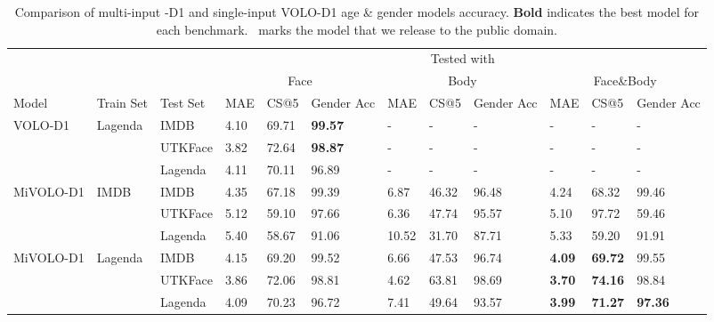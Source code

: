 \begin{table*}[t]
\centering
\begin{tabular}{|p{2.1cm}|p{1cm}|
p{1.3cm}|p{0.84cm} p{0.84cm} p{0.84cm} |p{0.84cm} p{0.84cm} p{0.84cm}|p{0.84cm} p{0.84cm} p{0.84cm}|}
\hline
\multicolumn{3}{|c|}{} & \multicolumn{9}{c|}{Tested with} \\ [1ex] 
\multicolumn{3}{|c|}{} & \multicolumn{3}{c|}{Face} & \multicolumn{3}{c|}{Body} & \multicolumn{3}{c|}{Face\&Body} \\ [1ex] 
\hline
\hline
 \multicolumn{1}{|p{2.0cm}|}{Model} & \multicolumn{1}{p{1.1cm}|}{Train Set} & \multicolumn{1}{p{1.3cm}|}{Test Set} & \multicolumn{1}{p{0.83cm}}{MAE} & \multicolumn{1}{p{0.83cm}}{CS@5} & \multicolumn{1}{p{0.86cm}|}{Gender Acc}& \multicolumn{1}{p{0.83cm}}{MAE} & \multicolumn{1}{p{0.83cm}}{CS@5} & \multicolumn{1}{p{0.86cm}|}{Gender Acc} & \multicolumn{1}{p{0.83cm}}{MAE} & \multicolumn{1}{p{0.83cm}}{CS@5} & \multicolumn{1}{p{0.86cm}|}{Gender Acc} \\ [1ex]
\hline
VOLO-D1 & Lagenda & IMDB & 4.10 & 69.71 & \textbf{99.57} & - & - & - & - & - & - \\  
 &  & UTKFace & 3.82 & 72.64 & \textbf{98.87} & - & - & - & - & - & - \\   
 &  & Lagenda & 4.11 & 70.11 & 96.89 & - & - & - & - & - & - \\   
\hline
MiVOLO-D1 & IMDB & IMDB & 4.35 & 67.18 & 99.39 & 6.87 & 46.32 & 96.48 & 4.24 & 68.32 & 99.46 \\   
 &  & UTKFace & 5.12 & 59.10 & 97.66 & 6.36 & 47.74 & 95.57 & 5.10 & 97.72 & 59.46 \\   
 &  & Lagenda & 5.40 & 58.67 & 91.06 & 10.52 & 31.70 & 87.71 & 5.33 & 59.20 & 91.91 \\ 
\hline
MiVOLO-D1 & Lagenda & IMDB & 4.15 & 69.20 & 99.52 & 6.66 & 47.53 & 96.74 & \textbf{4.09} & \textbf{69.72} & 99.55 \\   
 &  & UTKFace & 3.86 & 72.06 & 98.81 & 4.62 & 63.81 & 98.69 & \textbf{3.70} & \textbf{74.16} & 98.84 \\  
 &  & Lagenda & 4.09 & 70.23 & 96.72 & 7.41 & 49.64 & 93.57 & \textbf{3.99} & \textbf{71.27} & \textbf{97.36} \\
\hline
\end{tabular}
\caption{Comparison of multi-input \ModelName-D1 and single-input VOLO-D1 age \& gender models accuracy. \textbf{Bold} indicates the best model for each benchmark. \dag\ marks the model that we release to the public domain. }
\label{table:mivolo_results}
\end{table*}


